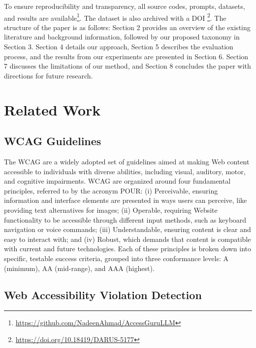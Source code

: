 \documentclass[sigconf, nonacm]{acmart}
\begin{document}
To ensure reproducibility and transparency, all source codes, prompts, datasets, and results are available\footnote{\url{https://github.com/NadeenAhmad/AccessGuruLLM}}. The dataset is also archived with a DOI \footnote{\url{https://doi.org/10.18419/DARUS-5177}}. The structure of the paper is as follows: Section 2 provides an overview of the existing literature and background information, followed by our proposed taxonomy in Section 3. Section 4 details our approach, Section 5 describes the evaluation process, and the results from our experiments are presented in Section 6. Section 7 discusses the limitations of our method, and Section 8 concludes the paper with directions for future research.

\section{Related Work}

\subsection{WCAG Guidelines}
The WCAG \cite{kirkpatrick2023wcag,caldwell2008Web} are a widely adopted set of guidelines aimed at making Web content accessible to individuals with diverse abilities, including visual, auditory, motor, and cognitive impairments. WCAG are organized around four fundamental principles, referred to by the acronym POUR: (i) Perceivable, ensuring information and interface elements are presented in ways users can perceive, like providing text alternatives for images; (ii) Operable, requiring Website functionality to be accessible through different input methods, such as keyboard navigation or voice commands; (iii) Understandable, ensuring content is clear and easy to interact with; and (iv) Robust, which demands that content is compatible with current and future technologies.
Each of these principles is broken down into specific, testable success criteria, grouped into three conformance levels: A (minimum), AA (mid-range), and AAA (highest). 

\subsection{Web Accessibility Violation Detection}
\end{document}
